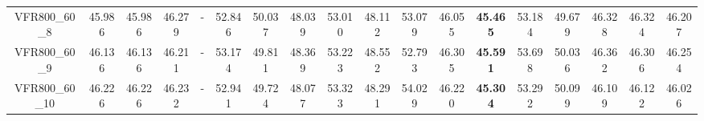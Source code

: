 \begin{tabular}{cc|ccc|ccccccccccccc}
VFR800\_60\_8      & 45.986           & 45.986           & 46.279           & -                & 52.846           & 50.037           & 48.039           & 53.010           & 48.112           & 53.079           & 46.055           & {\bf 45.465}     & 53.184           & 49.679           & 46.328           & 46.324           & 46.207          \\ 
VFR800\_60\_9      & 46.136           & 46.136           & 46.211           & -                & 53.174           & 49.811           & 48.369           & 53.223           & 48.552           & 52.793           & 46.305           & {\bf 45.591}     & 53.698           & 50.036           & 46.362           & 46.306           & 46.254          \\ 
VFR800\_60\_10     & 46.226           & 46.226           & 46.232           & -                & 52.941           & 49.724           & 48.077           & 53.323           & 48.291           & 54.029           & 46.220           & {\bf 45.304}     & 53.292           & 50.099           & 46.109           & 46.122           & 46.026          \\ 
\end{tabular}